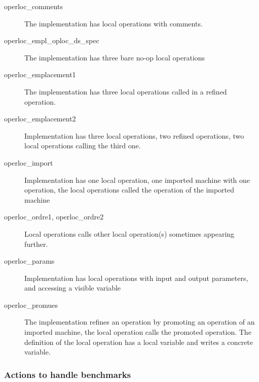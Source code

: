 \documentclass{article}
\begin{document}
\begin{description} 

\item[operloc\_comments] The implementation has
local operations with comments.  

\item[operloc\_empl\_oploc\_ds\_spec] The implementation has three bare
no-op local operations

\item[operloc\_emplacement1] The implementation has three local
operations called in a refined operation.

\item[operloc\_emplacement2] Implementation has three local operations,
two refined operations, two local operations calling the third one.

\item[operloc\_import] Implementation has one local operation, one
imported machine with one operation, the local operations called the
operation of the imported machine

\item[operloc\_ordre1, operloc\_ordre2] Local operations calls other local
operation(s) sometimes appearing further.

\item[operloc\_params] Implementation has local operations with input
and output parameters, and accessing a visible variable

\item[operloc\_promues] The implementation refines an operation by
  promoting an operation of an imported machine, the local operation
  calls the promoted operation. The definition of the local operation
  has a local variable and writes a concrete variable.

\end{description}

\subsubsection{Actions to handle benchmarks}
\end{document}
